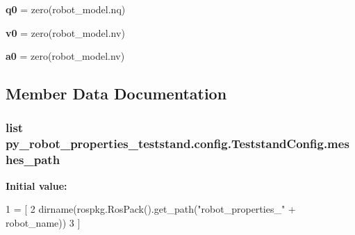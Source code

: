 \begin{DoxyCompactItemize}
\item 
{\bfseries q0} = zero(robot\+\_\+model.\+nq)\hypertarget{classpy__robot__properties__teststand_1_1config_1_1TeststandConfig_a86d0a6e6c038efa02f20efed9c0cefb2}{}\label{classpy__robot__properties__teststand_1_1config_1_1TeststandConfig_a86d0a6e6c038efa02f20efed9c0cefb2}

\item 
{\bfseries v0} = zero(robot\+\_\+model.\+nv)\hypertarget{classpy__robot__properties__teststand_1_1config_1_1TeststandConfig_a30b5cded89883c8f7d713fd9b70fc161}{}\label{classpy__robot__properties__teststand_1_1config_1_1TeststandConfig_a30b5cded89883c8f7d713fd9b70fc161}

\item 
{\bfseries a0} = zero(robot\+\_\+model.\+nv)\hypertarget{classpy__robot__properties__teststand_1_1config_1_1TeststandConfig_a8215d067b482f1e37bd6a957c2e3b9e4}{}\label{classpy__robot__properties__teststand_1_1config_1_1TeststandConfig_a8215d067b482f1e37bd6a957c2e3b9e4}

\end{DoxyCompactItemize}


\subsection{Member Data Documentation}
\subsubsection[{\texorpdfstring{meshes\+\_\+path}{meshes_path}}]{\setlength{\rightskip}{0pt plus 5cm}list py\+\_\+robot\+\_\+properties\+\_\+teststand.\+config.\+Teststand\+Config.\+meshes\+\_\+path\hspace{0.3cm}{\ttfamily [static]}}\hypertarget{classpy__robot__properties__teststand_1_1config_1_1TeststandConfig_a97ed7263634428ba248020b279f807a1}{}\label{classpy__robot__properties__teststand_1_1config_1_1TeststandConfig_a97ed7263634428ba248020b279f807a1}
{\bfseries Initial value\+:}
\begin{DoxyCode}
1 = [
2         dirname(rospkg.RosPack().get\_path(\textcolor{stringliteral}{"robot\_properties\_"} + robot\_name))
3     ]
\end{DoxyCode}
